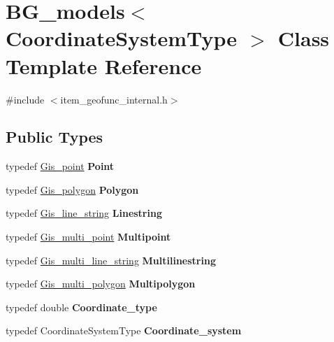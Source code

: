 \hypertarget{classBG__models}{}\section{B\+G\+\_\+models$<$ Coordinate\+System\+Type $>$ Class Template Reference}
\label{classBG__models}


{\ttfamily \#include $<$item\+\_\+geofunc\+\_\+internal.\+h$>$}

\subsection*{Public Types}
\begin{DoxyCompactItemize}
\item 
\mbox{\label{classBG__models_afbad3436336968842b701a68a072099e}} 
typedef \mbox{\hyperlink{classGis__point}{Gis\+\_\+point}} {\bfseries Point}
\item 
\mbox{\label{classBG__models_a79a832e717519f7324fed1f8a6765ecd}} 
typedef \mbox{\hyperlink{classGis__polygon}{Gis\+\_\+polygon}} {\bfseries Polygon}
\item 
\mbox{\label{classBG__models_a1941eeee0e9e9b5e546e5aa1abab87f9}} 
typedef \mbox{\hyperlink{classGis__line__string}{Gis\+\_\+line\+\_\+string}} {\bfseries Linestring}
\item 
\mbox{\label{classBG__models_a20fe6d5bc7a286987dd524187da737aa}} 
typedef \mbox{\hyperlink{classGis__multi__point}{Gis\+\_\+multi\+\_\+point}} {\bfseries Multipoint}
\item 
\mbox{\label{classBG__models_a6b968094c8f9bef713da463a74dc6c67}} 
typedef \mbox{\hyperlink{classGis__multi__line__string}{Gis\+\_\+multi\+\_\+line\+\_\+string}} {\bfseries Multilinestring}
\item 
\mbox{\label{classBG__models_a15ddad41aa9f679a0158a6829ada4d5b}} 
typedef \mbox{\hyperlink{classGis__multi__polygon}{Gis\+\_\+multi\+\_\+polygon}} {\bfseries Multipolygon}
\item 
\mbox{\label{classBG__models_a9df5c0192d46c11855ab76edfb9e48f8}} 
typedef double {\bfseries Coordinate\+\_\+type}
\item 
\mbox{\label{classBG__models_aa4af23ecb75af240b40b02be31089515}} 
typedef Coordinate\+System\+Type {\bfseries Coordinate\+\_\+system}
\end{DoxyCompactItemize}


